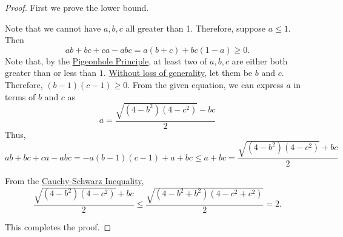 \documentclass[12pt]{article}
\begin{document}
$$$$

\begin{proof}
First we prove the lower bound.

Note that we cannot have $a, b, c$ all greater than 1.
Therefore, suppose $a \le 1$.
Then
$$ab + bc + ca - abc = a(b + c) + bc(1-a) \ge 0.$$
Note that, by the \href{https://artofproblemsolving.com/wiki/index.php/Pigeonhole_Principle}{Pigeonhole Principle}, at least two of $a,b,c$ are either both greater than or less than $1$. \href{https://artofproblemsolving.com/wiki/index.php/Without_loss_of_generality}{Without loss of generality}, let them be $b$ and $c$. Therefore, $(b-1)(c-1)\ge 0$. From the given equation, we can express $a$ in terms of $b$ and $c$ as
$$a=\frac{\sqrt{(4-b^2)(4-c^2)}-bc}{2}$$
Thus,
$$ab + bc + ca - abc = -a (b-1)(c-1)+a+bc \le a+bc = \frac{\sqrt{(4-b^2)(4-c^2)} + bc}{2}$$

From the \href{https://artofproblemsolving.com/wiki/index.php/Cauchy-Schwarz_Inequality}{Cauchy-Schwarz Inequality},
$$\frac{\sqrt{(4-b^2)(4-c^2)} + bc}{2} \le \frac{\sqrt{(4-b^2+b^2)(4-c^2+c^2)} }{2} = 2.$$

This completes the proof.
\end{proof}
\end{document}

